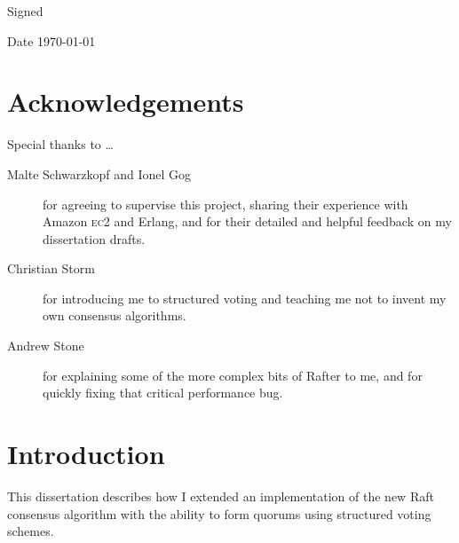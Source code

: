 \documentclass[12pt,chapterprefix=true,toc=bibliography,numbers=noendperiod,
               footnotes=multiple,twoside]{scrreprt}
\newcommand{\ECC}[0]{\textsc{ec}2}
\begin{document}
\vspace{0.3in}
Signed

\vspace{0.2in}
Date \hspace{0.4in} \today



\chapter*{Acknowledgements}
\label{ch:acknowledgements}

Special thanks to \dots

\begin{description}
    \item[Malte Schwarzkopf and Ionel Gog] for agreeing to supervise this project, sharing their experience with Amazon \ECC{} and Erlang, and for their detailed and helpful feedback on my dissertation drafts.
    \item[Christian Storm] for introducing me to structured voting and teaching me not to invent my own consensus algorithms.
    \item[Andrew Stone] for explaining some of the more complex bits of Rafter to me, and for quickly fixing that critical performance bug.
\end{description}

\tableofcontents





\chapter{Introduction}
\label{ch:introduction}


This dissertation describes how I extended an implementation of the new Raft consensus algorithm with the ability to form quorums using structured voting schemes.

\end{document}
